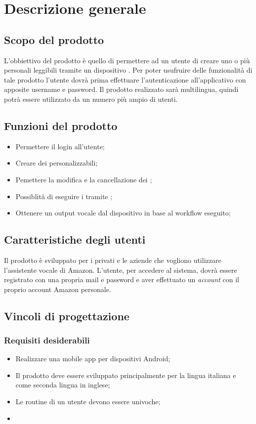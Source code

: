 \chapter{Descrizione generale}

\section{Scopo del prodotto}
L'obbiettivo del prodotto è quello di permettere ad un utente di creare uno o più  personali leggibili tramite un dispositivo .
Per poter usufruire delle funzionalità di tale prodotto l'utente dovrà prima effettuare l'autenticazione all'applicativo con apposite username e password.
Il prodotto realizzato sarà multilingua, quindi potrà essere utilizzato da un numero più ampio di utenti.


\section{Funzioni del prodotto}
\begin{itemize}
	\item Permettere il login all'utente;
	\item Creare dei  personalizzabili;
	\item Pemettere la modifica e la cancellazione dei ;
	\item Possiblità di eseguire i  tramite ; 
	\item Ottenere un output vocale dal dispositivo  in base al workflow eseguito;
\end{itemize}

\section{Caratteristiche degli utenti}
Il prodotto è sviluppato per i privati e le aziende che vogliono utilizzare l'assistente vocale  di Amazon.
L'utente, per accedere al sistema, dovrà essere registrato con una propria mail e password e aver effettuato un \textit{account}  con il proprio account Amazon personale.


\section{Vincoli di progettazione}
\subsection{Requisiti desiderabili}
\begin{itemize}
	\item Realizzare una mobile app per dispositivi Android;
	\item Il prodotto deve essere sviluppato principalmente per la lingua italiana e come seconda lingua in inglese;
	\item Le routine di un utente devono essere univoche;
	\item
\end{itemize}
